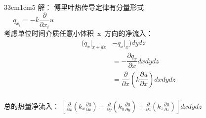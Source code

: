 \begin{frame}
	\frametitle{}
	~~~\hspace*{\fill} \\	
	~~~\hspace*{\fill} \\	
	\opencutright 
	\def\windowpagestuff{\flushright 
	\begin{tikzpicture}[math3d]
			\def\k{1.4}
			\draw [ ->] (-\k,-\k,-\k) --  (\k,-\k,-\k)  node[below] {$z$};
			\draw [ ->]  (-\k,-\k,-\k) -- (-\k, \k,-\k)   node[above] {$x$};
			\draw [ ->]  (-\k,-\k,-\k) -- (-\k,-\k, \k)    node[left] {$y$};
			\def\a{0.5}
			\def\b{0.5}
			\def\c{0.5}
			\coordinate (A01) at ( \a, \b, \c);
			\coordinate (A02) at ( \a,-\b, \c);
			\coordinate (A03) at (-\a,-\b, \c);
			\coordinate (A04) at (-\a, \b, \c);
			\coordinate (A05) at ( \a, \b,-\c);
			\coordinate (A06) at ( \a,-\b,-\c);
			\coordinate (A07) at (-\a,-\b,-\c);
			\coordinate (A08) at (-\a, \b,-\c);
			\draw(A01)--(A02)--(A03)--(A04)--cycle;
			\draw(A06)--(A05)--(A08);
			\draw[dash dot](A06)--(A07)--(A08);
			\draw(A01)--(A05)(A02)--(A06)(A04)--(A08);
			\draw[dash dot](A03)--(A07);
			\draw[line width =1pt]  (-\k,-1,-\k) node[below] {$x$}-- (-\k, 0.0,-\k)  node[below] {$x+dx$}; 
	\end{tikzpicture}}	
	\begin{cutout} {3}{3cm}{1cm}{5}
		\alert{解：}
		傅里叶热传导定律有分量形式 \\
		$~~~~~~q_{x_i}=-k \dfrac{\partial }{\partial x_{i}} u$ \\
		考虑单位时间介质任意小体积~x~方向的净流入：\\	
		\[\begin{aligned}
			(q_x|_{x+dx} &-q_x|_x)dydz \\
			&=-\dfrac{\partial q_x }{\partial x}  dxdydz\\
			&= \dfrac{\partial }{\partial x} (k\dfrac{\partial u}{\partial x})dxdydz \\
		\end{aligned}\]
	\end{cutout} 
	总的热量净流入：
	$[\frac{\partial }{\partial x} (k_x\frac{\partial u}{\partial x}) + \frac{\partial }{\partial y} (k_y\frac{\partial u}{\partial y}) + \frac{\partial }{\partial z} (k_z\frac{\partial u}{\partial z}) ]dxdydz $	
\end{frame}	


